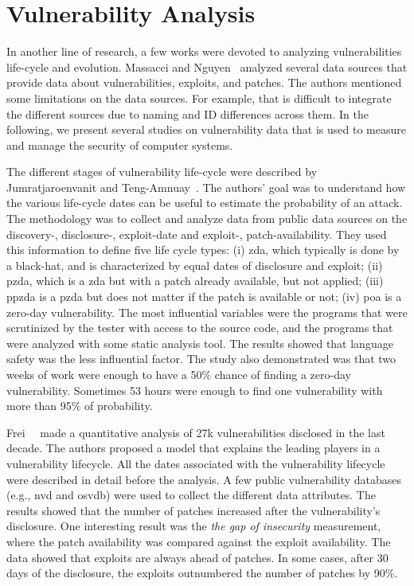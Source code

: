 \section{Vulnerability Analysis}
In another line of research, a few works were devoted to analyzing vulnerabilities life-cycle and evolution.
Massacci and Nguyen~\cite{Massacci:2010} analyzed several data sources that provide data about vulnerabilities, exploits, and patches.
The authors mentioned some limitations on the data sources.
For example, that is difficult to integrate the different sources due to naming and ID differences across them.
In the following, we present several studies on vulnerability data that is used to measure and manage the security of computer systems.


The different stages of vulnerability life-cycle were described by Jumratjaroenvanit and Teng-Amnuay~\cite{Jumratjaroenvanit:2008}.
The authors' goal was to understand how the various life-cycle dates can be useful to estimate the probability of an attack. 
The methodology was to collect and analyze data from public data sources on the discovery-, disclosure-, exploit-date and exploit-, patch-availability. 
They used this information to define five life cycle types: (i) \gls{zda}, which typically is done by a black-hat, and is characterized by equal dates of disclosure and exploit; (ii) \gls{pzda}, which is a \gls{zda} but with a patch already available, but not applied; 
(iii) \gls{ppzda} is a \gls{pzda} but does not matter if the patch is available or not; 
(iv) \gls{poa} is a zero-day vulnerability. 
The most influential variables were the programs that were scrutinized by the tester with access to the source code, and the programs that were analyzed with some static analysis tool. 
The results showed that language safety was the less influential factor. 
The study also demonstrated was that two weeks of work were enough to have a 50\% chance of finding a zero-day vulnerability. 
Sometimes 53 hours were enough to find one vulnerability with more than 95\% of probability.


Frei~\etal{}~\cite{Frei:2010} made a quantitative analysis of 27k vulnerabilities disclosed in the last decade.
The authors proposed a model that explains the leading players in a vulnerability lifecycle.
All the dates associated with the vulnerability lifecycle were described in detail before the analysis.
A few public vulnerability databases (e.g., \gls{nvd} and \gls{osvdb}) were used to collect the different data attributes.
The results showed that the number of patches increased after the vulnerability's disclosure.  
One interesting result was the \emph{the gap of insecurity} measurement, where the patch availability was compared against the exploit availability. 
The data showed that exploits are always ahead of patches.
In some cases, after 30 days of the disclosure, the exploits outnumbered the number of patches by 90\%.


